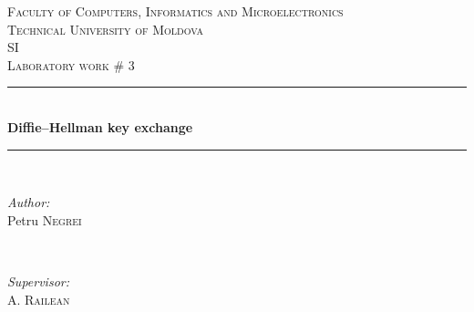 \documentclass{article}
\begin{document}
  \begin{titlepage}

 \newcommand{\HRule}{\rule{\linewidth}{0.5mm}} %
  \begin{center} %

  \textsc{\Large Faculty of Computers, Informatics and Microelectronics}\\[0.5cm]
  \textsc{\LARGE Technical University of Moldova}\\[1.2cm] %
  \vspace{25 mm}
  \textsc{\Large SI}\\[0.5cm] %
  \textsc{\large Laboratory work \# 3}\\[0.5cm] %

  \vspace{10 mm}
  \HRule \\[0.4cm]
  { \LARGE \bfseries Diffie–Hellman key exchange }\\[0.4cm] %
  \HRule \\[1.5cm]

  \vspace{40mm}

  \begin{minipage}{0.4\textwidth}
  \begin{flushleft} \large
  \emph{Author:}\\
  Petru \textsc{Negrei} %
  \end{flushleft}
  \end{minipage}
  ~
  \begin{minipage}{0.4\textwidth}
  \begin{flushright} \large
  \emph{Supervisor:} \\
  A. \textsc{Railean} %
  \end{flushright}
  \end{minipage}\\[4cm]


\end{center}
\end{titlepage}
\end{document}
